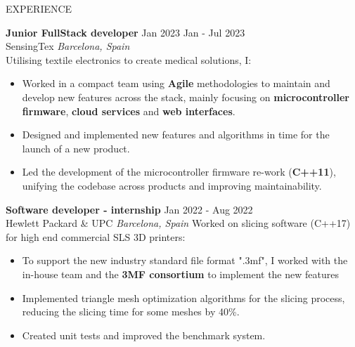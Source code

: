 \documentclass{resume} %
\begin{document}
\begin{rSection}{EXPERIENCE}

\textbf{Junior FullStack developer} \hfill Jan 2023 Jan - Jul 2023\\
SensingTex \hfill \textit{Barcelona, Spain}\\
Utilising textile electronics to create medical solutions, I:
\begin{itemize}
    \itemsep -3pt {} 
     \item Worked in a compact team using {\bf Agile} methodologies to maintain and develop new features across the stack, mainly focusing on {\bf microcontroller firmware}, {\bf cloud services} and {\bf web interfaces}.
     \item Designed and implemented new features and algorithms in time for the launch of a new product.
     \item Led the development of the microcontroller firmware re-work ({\bf C++11}), unifying the codebase across products and improving maintainability.
\end{itemize}
 
\textbf{Software developer - internship} \hfill Jan 2022 - Aug 2022\\
Hewlett Packard \& UPC \hfill \textit{Barcelona, Spain}
Worked on slicing software (C++17) for high end commercial SLS 3D printers: 
 \begin{itemize}
     \itemsep -3pt {} 
      \item To support the new industry standard file format ".3mf", I worked with the in-house team and the {\bf 3MF consortium} to implement the new features
      \item Implemented triangle mesh optimization algorithms for the slicing process, reducing the slicing time for some meshes by 40\%.
      \item Created unit tests and improved the benchmark system.
     \end{itemize}

\end{rSection} 

\end{document}
